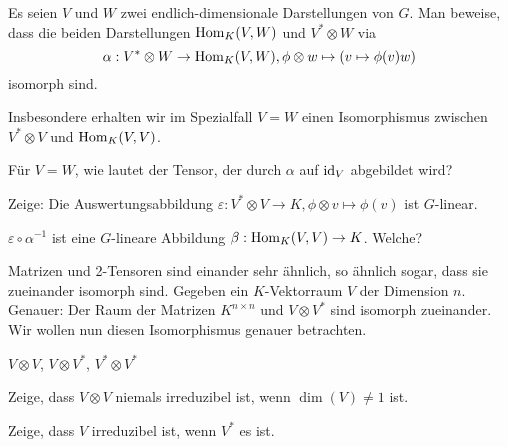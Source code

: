 \begin{sheet}
\begin{problem}[title={Isomorphismus zwischen Tensorprodukt und linearen Abbildungen}]\label{ex:hom_tensor_isomorphismus}
\begin{subproblem}
Es seien $V$ und $W$ zwei endlich-dimensionale Darstellungen von $G$. Man beweise, dass die beiden Darstellungen $\operatorname{Hom}_K(V,W)$ und $V^\ast \otimes W$ via
\[\alpha: V^\ast \otimes W \to \operatorname{Hom}_K(V,W), \phi \otimes w \mapsto (v\mapsto \phi(v)w)\]
isomorph sind.
\end{subproblem}

Insbesondere erhalten wir im Spezialfall $V=W$ einen Isomorphismus zwischen $V^\ast\otimes V$ und $\operatorname{Hom}_K(V,V)$.

\begin{subproblem}
Für $V=W$, wie lautet der Tensor, der durch $\alpha$ auf $\operatorname{id}_V$ abgebildet wird?
\end{subproblem}

\begin{subproblem}
Zeige: Die Auswertungsabbildung $\varepsilon: V^\ast \otimes V \to K, \phi\otimes v\mapsto \phi(v)$ ist $G$-linear.
\end{subproblem}

\begin{subproblem}
$\varepsilon\circ\alpha^{-1}$ ist eine $G$-lineare Abbildung $\beta: \operatorname{Hom}_K(V,V) \to K$. Welche?
\end{subproblem}
\begin{subproblem}
	Matrizen und 2-Tensoren sind einander sehr ähnlich, so ähnlich sogar, dass sie zueinander isomorph sind. Gegeben ein $K$-Vektorraum $V$ der Dimension $n$. Genauer: Der Raum der Matrizen $K^{n\times n}$ und $V\otimes V^\ast$ sind isomorph zueinander. Wir wollen nun diesen Isomorphismus genauer betrachten.
	
	$V\otimes V$, $V\otimes V^\ast$, $V^\ast \otimes V^\ast$
\end{subproblem}
\end{problem}


\begin{problem}[title={Reduzibilität von $V\otimes V$}]
Zeige, dass $V\otimes V$ niemals irreduzibel ist, wenn $\dim(V) \neq 1$ ist.
\end{problem}

\begin{problem}[title={Irreduzibilität von $V^\ast\implies$ Irreduzibilität von $V$?}]
Zeige, dass $V$ irreduzibel ist, wenn $V^\ast$ es ist.
\end{problem}


\end{sheet}

